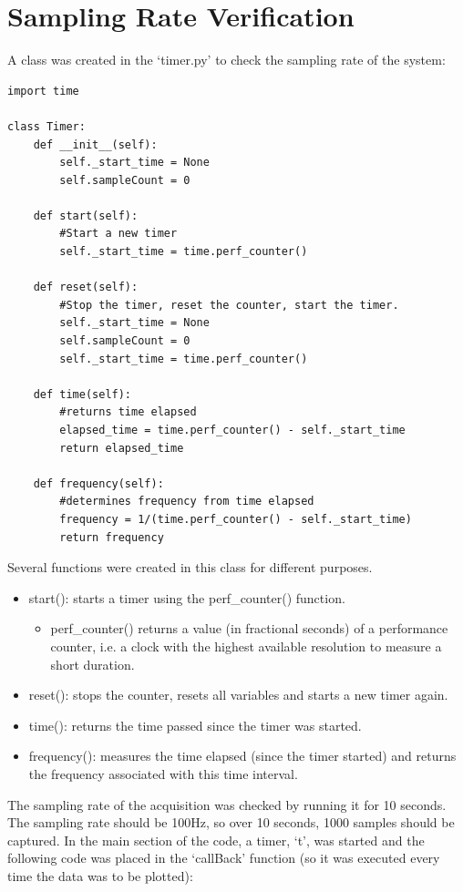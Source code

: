 \documentclass{article}
\begin{document}
\section{Sampling Rate Verification}
A class was created in the `timer.py' to check the sampling rate of the system:
\begin{lstlisting}
import time

class Timer:
    def __init__(self):
        self._start_time = None
        self.sampleCount = 0

    def start(self):
        #Start a new timer
        self._start_time = time.perf_counter()

    def reset(self):
        #Stop the timer, reset the counter, start the timer.
        self._start_time = None
        self.sampleCount = 0
        self._start_time = time.perf_counter()

    def time(self):
        #returns time elapsed
        elapsed_time = time.perf_counter() - self._start_time
        return elapsed_time
    
    def frequency(self):
        #determines frequency from time elapsed
        frequency = 1/(time.perf_counter() - self._start_time)
        return frequency
\end{lstlisting}
Several functions were created in this class for different purposes.
\begin{itemize}
  \item start(): starts a timer using the perf\_counter() function.
  \begin{itemize}
  \item perf\_counter() returns a value (in fractional seconds) of a performance counter, i.e. a clock with the highest available resolution to measure a short duration.
  \end{itemize}  
  \item reset(): stops the counter, resets all variables and starts a new timer again.
  \item time(): returns the time passed since the timer was started.
  \item frequency(): measures the time elapsed (since the timer started) and returns the frequency associated with this time interval.
\end{itemize}
The sampling rate of the acquisition was checked by running it for 10 seconds.\newline
The sampling rate should be 100Hz, so over 10 seconds, 1000 samples should be captured. In the main section of the code, a timer, `t', was started and the following code was placed in the `callBack' function (so it was executed every time the data was to be plotted):
\end{document}
